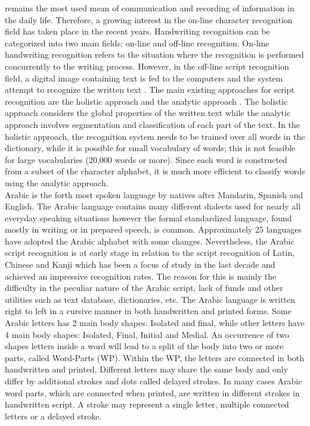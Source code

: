 \documentclass[12pt,journal,compsoc]{IEEEtran}
\begin{document}
 remains the most used mean of communication and recording of information in the daily life. Therefore, a growing interest in the on-line character recognition field has taken place in the recent years.
Handwriting recognition can be categorized into two main fields: on-line and off-line recognition. On-line handwriting recognition refers to the situation where the recognition is performed concurrently to the writing process. However, in the off-line script recognition field, a digital image containing text is fed to the computers and the system attempt to recognize the written text \cite{al2011online}. The main existing approaches for script recognition are the holistic approach \cite{biadsy2011segmentation} and the analytic approach \cite{abdulla2008off, sari2002off, Dinges2011, elanwar2012unconstrained}. The holistic approach considers the global properties of the written text while the analytic approach involves segmentation and classification of each part of the text.  In the holistic approach, the recognition system needs to be trained over all words in the dictionary, while it is possible for small vocabulary of words; this is not feasible for large vocabularies (20,000 words or more). Since each word is constructed from a subset of the character alphabet, it is much more efficient to classify words using the analytic approach. \cite{elanwar2012unconstrained} \\

Arabic is the forth most spoken language by natives after Mandarin, Spanish and English. The Arabic language contains many different dialects used for nearly all everyday speaking situations however the formal standardized language, found mostly in writing or in prepared speech, is common.  Approximately 25 languages have adopted the Arabic alphabet with some changes. Nevertheless, the Arabic script recognition is at early stage in relation to the script recognition of Latin, Chinese and Kanji which has been a focus of study in the last decade and achieved an impressive recognition rates. The reason for this is mainly the difficulty in the peculiar nature of the Arabic script, lack of funds and other utilities such as text database, dictionaries, etc. \cite{zeki2011segmentation}
The Arabic language is written right to left in a cursive manner in both handwritten and printed forms. Some Arabic letters has 2 main body shapes: Isolated and final, while other letters have 4 main body shapes: Isolated, Final, Initial and Medial. An occurrence of two shapes letters inside a word will lead to a split of the body into two or more parts, called Word-Parts (WP). Within the WP, the letters are connected in both handwritten and printed. Different letters may share the same body and only differ by additional strokes and dots called delayed strokes. In many cases Arabic word parts, which are connected when printed, are written in different strokes in handwritten script. A stroke may represent a single letter, multiple connected letters or a delayed stroke.
 
\end{document}
